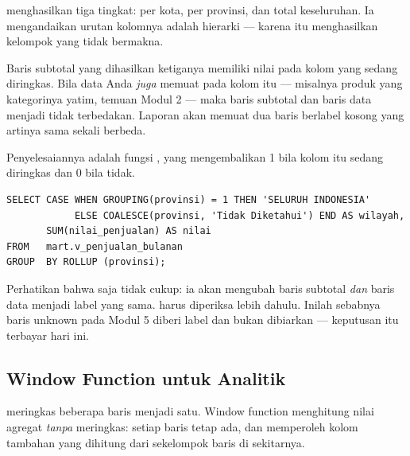  menghasilkan tiga tingkat: per kota, per
provinsi, dan total keseluruhan. Ia mengandaikan urutan kolomnya adalah
hierarki --- karena itu  menghasilkan
kelompok yang tidak bermakna.

\begin{peringatan}
Baris subtotal yang dihasilkan ketiganya memiliki nilai  pada
kolom yang sedang diringkas. Bila data Anda \emph{juga} memuat
 pada kolom itu --- misalnya produk yang kategorinya yatim,
temuan Modul 2 --- maka baris subtotal dan baris data menjadi tidak
terbedakan. Laporan akan memuat dua baris berlabel kosong yang artinya sama
sekali berbeda.
\end{peringatan}

Penyelesaiannya adalah fungsi , yang mengembalikan 1 bila
kolom itu sedang diringkas dan 0 bila tidak.

\begin{lstlisting}[style=sqlgaya]
SELECT CASE WHEN GROUPING(provinsi) = 1 THEN 'SELURUH INDONESIA'
            ELSE COALESCE(provinsi, 'Tidak Diketahui') END AS wilayah,
       SUM(nilai_penjualan) AS nilai
FROM   mart.v_penjualan_bulanan
GROUP  BY ROLLUP (provinsi);
\end{lstlisting}

\begin{catatan}
Perhatikan bahwa  saja tidak cukup: ia akan mengubah baris
subtotal \emph{dan} baris data menjadi label yang sama. 
harus diperiksa lebih dahulu. Inilah sebabnya baris unknown pada Modul 5
diberi label  dan bukan dibiarkan
 --- keputusan itu terbayar hari ini.
\end{catatan}

\subsection{Window Function untuk Analitik}

 meringkas beberapa baris menjadi satu. Window function
menghitung nilai agregat \emph{tanpa} meringkas: setiap baris tetap ada, dan
memperoleh kolom tambahan yang dihitung dari sekelompok baris di sekitarnya.

